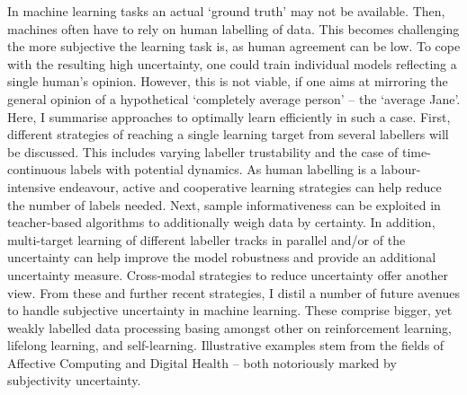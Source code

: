 
In machine learning tasks an actual `ground truth' may not be available. Then, machines often have to rely on human labelling of data. This becomes challenging the more subjective the learning task is, as human agreement can be low. To cope with the resulting high uncertainty, one could train individual models reflecting a single human's opinion. However, this is not viable, if one aims at mirroring the general opinion of a hypothetical `completely average person' -- the `average Jane'. Here, I summarise approaches to optimally learn efficiently in such a case. First, different strategies of reaching a single learning target from several labellers will be discussed. This includes varying labeller trustability and the case of time-continuous labels with potential dynamics. As human labelling is a labour-intensive endeavour, active and cooperative learning strategies can help reduce the number of labels needed. Next, sample informativeness can be exploited in teacher-based algorithms to additionally weigh data by certainty. In addition, multi-target learning of different labeller tracks in parallel and/or of the uncertainty can help improve the model robustness and provide an additional uncertainty measure. Cross-modal strategies to reduce uncertainty offer another view. From these and further recent strategies, I distil a number of future avenues to handle subjective uncertainty in machine learning. These comprise bigger, yet weakly labelled data processing basing amongst other on reinforcement learning, lifelong learning, and self-learning. Illustrative examples stem from the fields of Affective Computing and Digital Health -- both notoriously marked by subjectivity uncertainty.

% 
